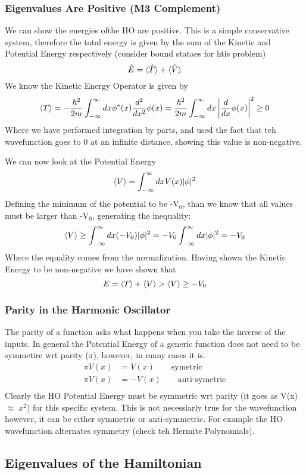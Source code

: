 \documentclass{article}
\newcommand{\be}{\begin{equation}}
\newcommand{\ee}{\end{equation}}
\begin{document}
\subsubsection*{Eigenvalues Are Positive (M3 Complement)}
We can show the energies ofthe HO are positive.
This is a simple conservative system, therefore the total energy is given by the sum of the Kinetic and Potential Energy respectively (consider bound stataes for htis problem)
\be
\hat{E} = \braket{\hat{T}} + \braket{\hat{V}}
\ee
We know the Kinetic Energy Operator is given by
\be
\braket{T} = -\frac{\hbar^2}{2m}\int_{-\infty}^\infty dx \phi^*(x) \frac{d^2}{dx^2} \phi(x) = \frac{\hbar^2}{2m} \int_{-\infty}^\infty dx \left|\frac{d}{dx}\phi(x)\right|^2 \geq 0
\ee
Where we have performed integration by parts, and used the fact that teh wavefunction goes to 0 at an infinite distance, showing this value is non-negative.

We can now look at the Potential Energy
\be
\braket{V} = \int_{-\infty}^\infty dx V(x) |\phi|^2
\ee
Defining the minimum of the potential to be -V$_0$, than we know that all values must be larger than -V$_0$, generating the inequality:
\be
\braket{V} \geq \int_{-\infty}^\infty dx (-V_0) |\phi|^2 = -V_0 \int_{-\infty}^\infty dx |\phi|^2 = -V_0
\ee
Where the equality comes from the normalization. 
Having shown the Kinetic Energy to be non-negative we have shown that
\be
E = \braket{T} + \braket{V} > \braket{V} \geq -V_0
\ee

\subsubsection*{Parity in the Harmonic Oscillator}
The parity of a function asks what happens when you take the inverse of the inputs.
In general the Potential Energy of a generic function does not need to be symmetirc wrt parity ($\pi$), however, in many cases it is. 
\be
\begin{split}
    \pi V(x) &= V(x) \quad \quad \text{symetric}\\
    \pi V(x) &= -V(x) \quad \quad \text{anti-symetric}\\
\end{split}
\ee
Clearly the HO Potential Energy  must be symmetric wrt parity (it goes as V(x) $\approx$ $x^2$) for this specific system. 
This is not necessiarly true for the wavefunction however, it can be either symmetric or anti-symmetric.
For example the HO wavefunction alternates symmetry (check teh Hermite Polynomials). 

\subsection*{Eigenvalues of the Hamiltonian}
\end{document}
